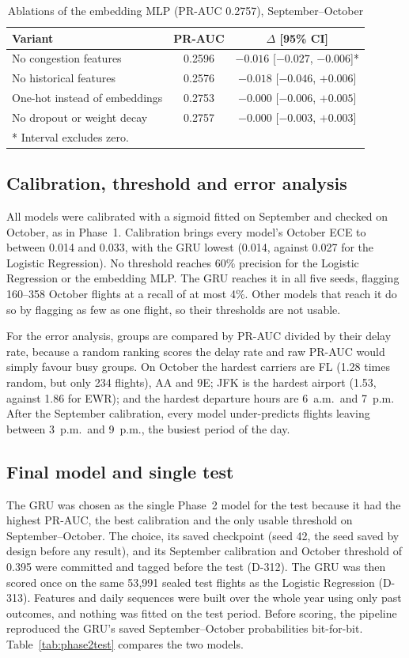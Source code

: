 \begin{table}[htbp]
\centering
\caption{Ablations of the embedding MLP (PR-AUC 0.2757), September--October}
\label{tab:ablation}
\begin{tabular}{lcc}
\toprule
Variant & PR-AUC & $\Delta$ [95\% CI] \\
\midrule
No congestion features & 0.2596 & $-0.016$ [$-0.027$, $-0.006$]* \\
No historical features & 0.2576 & $-0.018$ [$-0.046$, $+0.006$] \\
One-hot instead of embeddings & 0.2753 & $-0.000$ [$-0.006$, $+0.005$] \\
No dropout or weight decay & 0.2757 & $-0.000$ [$-0.003$, $+0.003$] \\
\bottomrule
\multicolumn{3}{l}{* Interval excludes zero.}
\end{tabular}
\end{table}

\subsection{Calibration, threshold and error analysis}
All models were calibrated with a sigmoid fitted on September and checked on October, as in
Phase~1. Calibration brings every model's October ECE to between 0.014 and 0.033, with the GRU
lowest (0.014, against 0.027 for the Logistic Regression). No threshold reaches 60\% precision for
the Logistic Regression or the embedding MLP. The GRU reaches it in all five seeds, flagging
160--358 October flights at a recall of at most 4\%. Other models that reach it do so by flagging as
few as one flight, so their thresholds are not usable.

For the error analysis, groups are compared by PR-AUC divided by their delay rate, because a random
ranking scores the delay rate and raw PR-AUC would simply favour busy groups. On October the hardest
carriers are FL (1.28 times random, but only 234 flights), AA and 9E; JFK is the hardest airport
(1.53, against 1.86 for EWR); and the hardest departure hours are 6~a.m.\ and 7~p.m. After the September calibration, every
model under-predicts flights leaving between 3~p.m.\ and 9~p.m., the busiest period of the day.

\subsection{Final model and single test}
The GRU was chosen as the single Phase~2 model for the test because it had the highest PR-AUC, the
best calibration and the only usable threshold on September--October. The choice, its saved
checkpoint (seed 42, the seed saved by design before any result), and its September calibration
and October threshold of 0.395 were committed and tagged before the test (D-312). The GRU was then
scored once on the same 53{,}991 sealed test flights as the Logistic Regression (D-313). Features
and daily sequences were built over the whole year using only past outcomes, and nothing was fitted
on the test period. Before scoring, the pipeline reproduced the GRU's saved September--October
probabilities bit-for-bit. Table~\ref{tab:phase2test} compares the two models.

